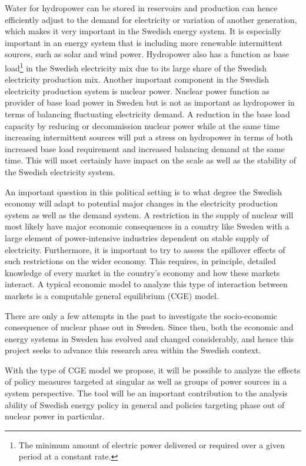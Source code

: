 Water for hydropower can be stored in reservoirs and production can hence efficiently adjust to the demand for electricity or variation of another generation, which makes it very important in the Swedish energy system. It is especially important in an energy system that is including more renewable intermittent sources, such as solar and wind power. Hydropower also has a function as base load\footnote{The minimum amount of electric power delivered or required over a given period at a constant rate.} in the Swedish electricity mix due to its large share of the Swedish electricity production mix. Another important component in the Swedish electricity production system is nuclear power. Nuclear power function as provider of base load power in Sweden but is not as important as hydropower in terms of balancing fluctuating electricity demand. A reduction in the base load capacity by reducing or decommission nuclear power while at the same time increasing intermittent sources will put a stress on hydropower in terms of both increased base load requirement and increased balancing demand at the same time. This will most certainly have impact on the scale as well as the stability of the Swedish electricity system.

An important question in this political setting is to what degree the Swedish economy will adapt to potential major changes in the electricity production system as well as the demand system. A restriction in the supply of nuclear will most likely have major economic consequences in a country like Sweden with a large element of power-intensive industries dependent on stable supply of electricity. Furthermore, it is important to try to assess the spillover effects of such restrictions on the wider economy. This requires, in principle, detailed knowledge of every market in the country's economy and how these markets interact. A typical economic model to analyze this type of interaction between markets is a computable general equilibrium (CGE) model.

There are only a few attempts in the past to investigate the socio-economic consequence of nuclear phase out in Sweden. Since then, both the economic and energy systems in Sweden has evolved and changed considerably, and hence this project seeks to advance this research area within the Swedish context. 

With the type of CGE model we propose, it will be possible to analyze the effects of policy measures targeted at singular as well as groups of power sources in a system perspective. The tool will be an important contribution to the analysis ability of Swedish energy policy in general and policies targeting phase out of nuclear power in particular.

